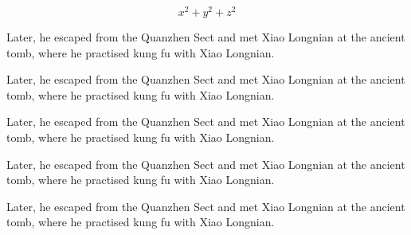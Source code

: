 \documentclass[doctor, vlined]{DissertUESTC}
\begin{document}
\begin{longtable}{p{2em} p{6em}}
	\end{longtable}
	

	\begin{equation}
		x^2 + y^2 + z^2
	\end{equation}
	


	\begin{Definition}[Name]
		Later, he escaped from the Quanzhen Sect and met Xiao Longnian at the ancient tomb, where he practised kung fu with Xiao Longnian.
	\end{Definition}

	\begin{Axiom}[Name]
		Later, he escaped from the Quanzhen Sect and met Xiao Longnian at the ancient tomb, where he practised kung fu with Xiao Longnian.
	\end{Axiom}
	
	\begin{Theorem}[Name]
		Later, he escaped from the Quanzhen Sect and met Xiao Longnian at the ancient tomb, where he practised kung fu with Xiao Longnian.
	\end{Theorem}
	
	\begin{Proposition}[Name]
		Later, he escaped from the Quanzhen Sect and met Xiao Longnian at the ancient tomb, where he practised kung fu with Xiao Longnian.
	\end{Proposition}
	
	\begin{Corollary}[Name]
		Later, he escaped from the Quanzhen Sect and met Xiao Longnian at the ancient tomb, where he practised kung fu with Xiao Longnian.
	\end{Corollary}
	
\end{document}

